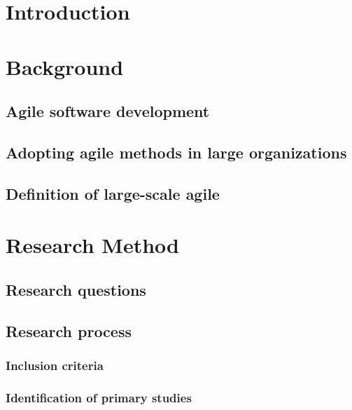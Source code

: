 \documentclass{article}
\author{Ville Kumpulainen}
\begin{document}


\clearpage
{}

\clearpage
\begin{spacing}{0.9}
\tableofcontents
\end{spacing}

\setlength{\parskip}{7pt}
\clearpage

\clearpage
\section{Introduction}


\section{Background}

\subsection{Agile software development}

\subsection{Adopting agile methods in large organizations}

\subsection{Definition of large-scale agile}


\section{Research Method}

\subsection{Research questions}

\subsection{Research process}

\subsubsection{Inclusion criteria}

\subsubsection{Identification of primary studies}

\end{document}

